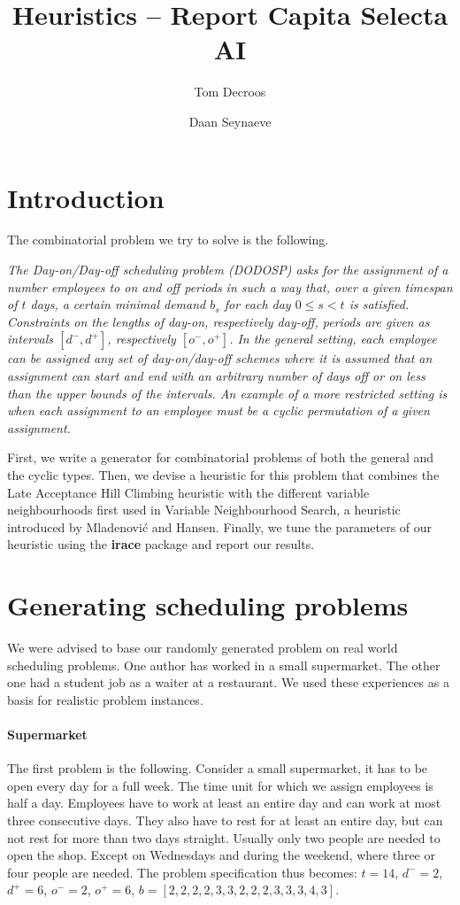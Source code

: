 \documentclass[]{article}
\title{Heuristics -- Report
	Capita Selecta AI}
\author{Tom Decroos \and Daan Seynaeve}
\begin{document}
\maketitle
\section{Introduction}
The combinatorial problem we try to solve is the following.

\textit{The Day-on/Day-off scheduling problem (DODOSP) asks for the assignment of a number employees to on and off periods in such a way that, over a given timespan of $t$ days, a certain minimal demand $b_s$ for each day $0 \leq s < t$ is satisfied. Constraints on the lengths of day-on, respectively day-off, periods are given as intervals $[d^-,d^+]$, respectively $[o^-,o^+]$. In the general setting, each employee can be assigned any set of day-on/day-off schemes where it is assumed that an assignment can start and end with an arbitrary number of days off or on less than the upper bounds of the intervals. An example of a more restricted setting is when each assignment to an employee must be a cyclic permutation of a given assignment.}

First, we write a generator for combinatorial problems of both the general and the cyclic types. Then, we devise a heuristic for this problem that combines the Late Acceptance Hill Climbing heuristic \cite{burke2012late} with the different variable neighbourhoods first used in Variable Neighbourhood Search, a heuristic introduced by Mladenovi{\'c} and Hansen. \cite{mladenovic1997variable} Finally, we tune the parameters of our heuristic using the \textbf{irace} package \cite{LopDubStu2011irace} and report our results.
\section{Generating scheduling problems}
We were advised to base our randomly generated problem on real world scheduling problems. One author has worked in a small supermarket. The other one had a student job as a waiter at a restaurant. We used these experiences as a basis for realistic problem instances.

\paragraph{Supermarket}
The first problem is the following. Consider a small supermarket, it has to be open every day for a full week. The time unit for which we assign employees is half a day. Employees have to work at least an entire day and can work at most three consecutive days. They also have to rest for at least an entire day, but can not rest for more than two days straight. Usually only two people are needed to open the shop. Except on Wednesdays and during the weekend, where three or four people are needed. The problem specification thus becomes: $t=14$, $d^- = 2$, $d^+ = 6$, $o^- = 2$, $o^+ = 6$, $b = [2,2,2,2,3,3,2,2,2,3,3,3,4,3]$.
\end{document}
